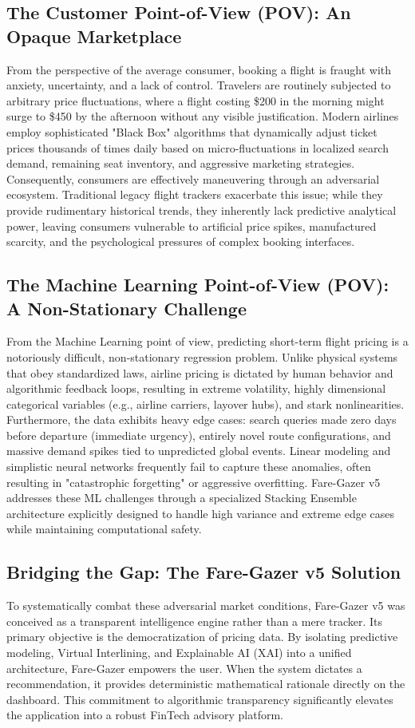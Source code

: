\documentclass[12pt, a4paper]{article}
\begin{document}
\subsection{The Customer Point-of-View (POV): An Opaque Marketplace}
From the perspective of the average consumer, booking a flight is fraught with anxiety, uncertainty, and a lack of control. Travelers are routinely subjected to arbitrary price fluctuations, where a flight costing \$200 in the morning might surge to \$450 by the afternoon without any visible justification. Modern airlines employ sophisticated "Black Box" algorithms that dynamically adjust ticket prices thousands of times daily based on micro-fluctuations in localized search demand, remaining seat inventory, and aggressive marketing strategies. Consequently, consumers are effectively maneuvering through an adversarial ecosystem. Traditional legacy flight trackers exacerbate this issue; while they provide rudimentary historical trends, they inherently lack predictive analytical power, leaving consumers vulnerable to artificial price spikes, manufactured scarcity, and the psychological pressures of complex booking interfaces.

\subsection{The Machine Learning Point-of-View (POV): A Non-Stationary Challenge}
From the Machine Learning point of view, predicting short-term flight pricing is a notoriously difficult, non-stationary regression problem. Unlike physical systems that obey standardized laws, airline pricing is dictated by human behavior and algorithmic feedback loops, resulting in extreme volatility, highly dimensional categorical variables (e.g., airline carriers, layover hubs), and stark nonlinearities. Furthermore, the data exhibits heavy edge cases: search queries made zero days before departure (immediate urgency), entirely novel route configurations, and massive demand spikes tied to unpredicted global events. Linear modeling and simplistic neural networks frequently fail to capture these anomalies, often resulting in "catastrophic forgetting" or aggressive overfitting. Fare-Gazer v5 addresses these ML challenges through a specialized Stacking Ensemble architecture explicitly designed to handle high variance and extreme edge cases while maintaining computational safety.

\subsection{Bridging the Gap: The Fare-Gazer v5 Solution}
To systematically combat these adversarial market conditions, Fare-Gazer v5 was conceived as a transparent intelligence engine rather than a mere tracker. Its primary objective is the democratization of pricing data. By isolating predictive modeling, Virtual Interlining, and Explainable AI (XAI) into a unified architecture, Fare-Gazer empowers the user. When the system dictates a recommendation, it provides deterministic mathematical rationale directly on the dashboard. This commitment to algorithmic transparency significantly elevates the application into a robust FinTech advisory platform.
\end{document}

